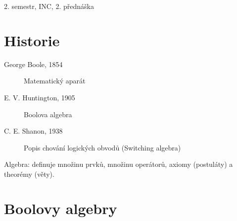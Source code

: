 \documentclass[a4wide]{report}
\begin{document}
2. semestr, INC, 2. přednáška

\section{Historie}
\begin{description}
	\item[George Boole, 1854] Matematický aparát
	\item[E. V. Huntington, 1905] Boolova algebra
	\item[C. E. Shanon, 1938] Popis chování logických obvodů (Switching algebra)
\end{description}

Algebra: definuje množinu prvků, množinu operátorů, axiomy (postuláty) a theorémy (věty).

\section{Boolovy algebry}
\end{document}
